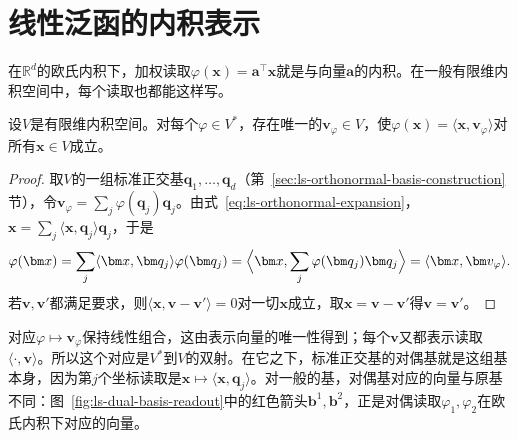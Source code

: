 
\section{线性泛函的内积表示}
\label{sec:ls-riesz-representation}
在$\mathbb R^d$的欧氏内积下，加权读取$\varphi(\bm x)=\bm a^\top\bm x$就是与向量$\bm a$的内积。在一般有限维内积空间中，每个读取也都能这样写。
\begin{theorem}[有限维Riesz表示定理]
\label{thm:ls-riesz-representation}
设$V$是有限维内积空间。对每个$\varphi\in V^*$，存在唯一的$\bm v_\varphi\in V$，使$\varphi(\bm x)=\langle\bm x,\bm v_\varphi\rangle$对所有$\bm x\in V$成立。
\end{theorem}
\begin{proof}
取$V$的一组标准正交基$\bm q_1,\ldots,\bm q_d$（第~\ref{sec:ls-orthonormal-basis-construction}节），令$\bm v_\varphi=\sum_j\varphi(\bm q_j)\bm q_j$。由式~\eqref{eq:ls-orthonormal-expansion}，$\bm x=\sum_j\langle\bm x,\bm q_j\rangle\bm q_j$，于是
\[
 \varphi(\bm x)=\sum_j\langle\bm x,\bm q_j\rangle\varphi(\bm q_j)=\Bigl\langle\bm x,\sum_j\varphi(\bm q_j)\bm q_j\Bigr\rangle=\langle\bm x,\bm v_\varphi\rangle.
\]
若$\bm v,\bm v'$都满足要求，则$\langle\bm x,\bm v-\bm v'\rangle=0$对一切$\bm x$成立，取$\bm x=\bm v-\bm v'$得$\bm v=\bm v'$。
\end{proof}
对应$\varphi\mapsto\bm v_\varphi$保持线性组合，这由表示向量的唯一性得到；每个$\bm v$又都表示读取$\langle\cdot,\bm v\rangle$。所以这个对应是$V^*$到$V$的双射。在它之下，标准正交基的对偶基就是这组基本身，因为第$j$个坐标读取是$\bm x\mapsto\langle\bm x,\bm q_j\rangle$。对一般的基，对偶基对应的向量与原基不同：图~\ref{fig:ls-dual-basis-readout}中的红色箭头$\bm b^1,\bm b^2$，正是对偶读取$\varphi_1,\varphi_2$在欧氏内积下对应的向量。

